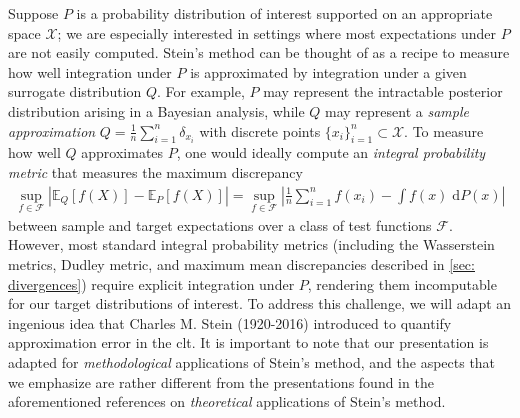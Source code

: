 \documentclass[12pt,paper=letter]{scrreprt}
\def\mbb#1{\mathbb{#1}}
\def\E{\mbb{E}} %
\begin{document}
Suppose $P$ is a probability distribution of interest supported on an appropriate space $\mathcal{X}$; we are especially interested in settings where most expectations under $P$ are not easily computed. 
Stein's method can be thought of as a recipe to measure how well integration under $P$ is approximated by integration under a given surrogate distribution $Q$.
For example, $P$ may represent the intractable posterior distribution arising in a Bayesian analysis, while $Q$ may represent a \emph{sample approximation} $Q = \frac{1}{n}\sum_{i=1}^n\delta_{x_i}$ with discrete points $\{x_i\}_{i=1}^n \subset \mathcal{X}$. 
%
To measure how well $Q$ approximates $P$, one would ideally compute an \emph{integral probability metric} \citep{muller1997integral} that measures the maximum discrepancy 
\begin{align*}
\sup_{f\in\mathcal{F}} \left|\E_Q[f(X)]-\E_P[f(X)]\right|
=
\sup_{f\in\mathcal{F}}\left|\frac{1}{n}\sum_{i=1}^nf(x_i) -\int f(x) \; \mathrm{d}P(x)\right|
\end{align*}
between sample and target expectations over a class of test functions $\mathcal{F}$. 
%
However, most standard integral probability metrics (including the Wasserstein metrics, Dudley metric, and maximum mean discrepancies described in \cref{sec: divergences}) require explicit integration under $P$, rendering them incomputable for our target distributions of interest. 
To address this challenge, we will adapt an ingenious idea that Charles M. Stein (1920-2016) introduced to quantify approximation error in the \ac{clt}. 
It is important to note that our presentation is adapted for \emph{methodological} applications of Stein's method, and the aspects that we emphasize are rather different from the presentations found in the aforementioned references on \emph{theoretical} applications of Stein's method.
\end{document}
